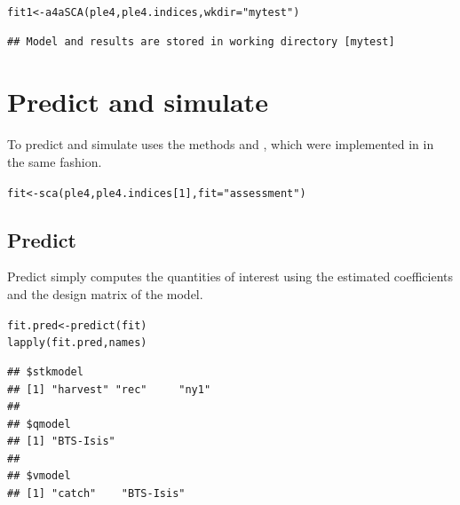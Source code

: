 \documentclass[a4paper,english,10pt]{article}\usepackage[]{graphicx}\usepackage[]{color}
\makeatletter
\newcommand{\hlnum}[1]{\textcolor[rgb]{0.063,0.58,0.627}{#1}}%
\newcommand{\hlstr}[1]{\textcolor[rgb]{0.063,0.58,0.627}{#1}}%
\newcommand{\hlstd}[1]{\textcolor[rgb]{0.196,0.196,0.196}{#1}}%
\newcommand{\hlkwb}[1]{\textcolor[rgb]{0.627,0,0.314}{#1}}%
\newcommand{\hlkwc}[1]{\textcolor[rgb]{0,0.631,0.314}{#1}}%
\newcommand{\hlkwd}[1]{\textcolor[rgb]{0.78,0.227,0.412}{#1}}%
\newenvironment{kframe}{%
 \def\at@end@of@kframe{}%
 \ifinner\ifhmode%
  \def\at@end@of@kframe{\end{minipage}}%
  \begin{minipage}{\columnwidth}%
 \fi\fi%
 \def\FrameCommand##1{\hskip\@totalleftmargin \hskip-\fboxsep
 \colorbox{shadecolor}{##1}\hskip-\fboxsep
     \hskip-\linewidth \hskip-\@totalleftmargin \hskip\columnwidth}%
 \MakeFramed {\advance\hsize-\width
   \@totalleftmargin\z@ \linewidth\hsize
   \@setminipage}}%
 {\par\unskip\endMakeFramed%
 \at@end@of@kframe}
\newenvironment{knitrout}{}{} %
\makeatother
\begin{document}
\begin{knitrout}
\color{fgcolor}\begin{kframe}
\begin{alltt}
\hlstd{fit1} \hlkwb{<-} \hlkwd{a4aSCA}\hlstd{(ple4, ple4.indices,} \hlkwc{wkdir} \hlstd{=} \hlstr{"mytest"}\hlstd{)}
\end{alltt}
\begin{verbatim}
## Model and results are stored in working directory [mytest]
\end{verbatim}
\end{kframe}
\end{knitrout}

\section{Predict and simulate}

To predict and simulate  uses the methods  and , which were implemented in  in the same fashion.

\begin{knitrout}
\color{fgcolor}\begin{kframe}
\begin{alltt}
\hlstd{fit} \hlkwb{<-} \hlkwd{sca}\hlstd{(ple4, ple4.indices[}\hlnum{1}\hlstd{],} \hlkwc{fit} \hlstd{=} \hlstr{"assessment"}\hlstd{)}
\end{alltt}
\end{kframe}
\end{knitrout}

\subsection{Predict}

Predict simply computes the quantities of interest using the estimated coefficients and the design matrix of the model.

\begin{knitrout}
\color{fgcolor}\begin{kframe}
\begin{alltt}
\hlstd{fit.pred} \hlkwb{<-} \hlkwd{predict}\hlstd{(fit)}
\hlkwd{lapply}\hlstd{(fit.pred, names)}
\end{alltt}
\begin{verbatim}
## $stkmodel
## [1] "harvest" "rec"     "ny1"    
## 
## $qmodel
## [1] "BTS-Isis"
## 
## $vmodel
## [1] "catch"    "BTS-Isis"
\end{verbatim}
\end{kframe}
\end{knitrout}
\end{document}
